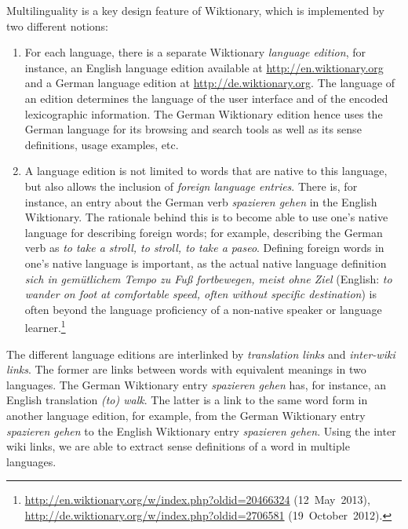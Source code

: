 \documentclass[output=paper]{LSP/langsci}
\begin{document}
Multilinguality is a key design feature of Wiktionary, which is implemented by two different notions:
\begin{enumerate}
  \item For each language, there is a separate Wiktionary \emph{language edition}, for instance, an English language edition available at \url{http://en.wiktionary.org} and a German language edition at \url{http://de.wiktionary.org}. The language of an edition determines the language of the user interface and of the encoded lexicographic information. 
  The German Wiktionary edition hence uses the German language for its browsing and search tools as well as its sense definitions, usage examples, etc.
  \item A language edition is not limited to words that are native to this language, but also allows the inclusion of \emph{foreign language entries}. There is, for instance, an entry about the German verb \textit{spazieren ge\-hen} in the English Wiktionary. The rationale behind this is to become able to use one's native language for describing foreign words; for example, describing the German verb as \textit{to take a stroll, to stroll, to take a paseo}. Defining foreign words in one's native language is important, as the actual native language definition \textit{sich in gem\"{u}tlichem Tempo zu Fu{\ss} fortbewegen, meist ohne Ziel} (English: \textit{to wander on foot at comfortable speed, often without specific destination}) is often beyond the language proficiency of a non-native speaker or language learner.\footnote{\raggedright\url{http://en.wiktionary.org/w/index.php?oldid=20466324} (12~May~2013), \url{http://de.wiktionary.org/w/index.php?oldid=2706581} (19~October~2012).}
\end{enumerate}
The different language editions are interlinked by \emph{translation links} and \emph{inter-wiki links}. The former are links between words with equivalent meanings in two languages. The German Wiktionary entry \textit{spazieren ge\-hen} has, for instance, an English translation \textit{(to) walk}. The latter is a link to the same word form in another language edition, for example, from the German Wiktionary entry \textit{spazieren ge\-hen} to the English Wiktionary entry \textit{spazieren ge\-hen}. Using the inter wiki links, we are able to extract sense definitions of a word in multiple languages. 
\end{document}
